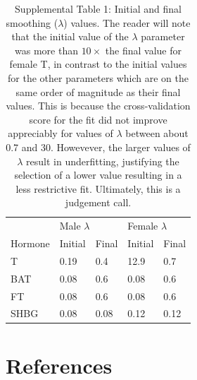 \documentclass[]{elsarticle} %
\begin{document}
\begin{table}[]
\caption*{Supplemental Table 1: Initial and final smoothing ($\lambda$) values. The reader will note that the initial value of the $\lambda$ parameter was more than $10\times$ the final value for female T, in contrast to the initial values for the other parameters which are on the same order of magnitude as their final values. This is because the cross-validation score for the fit did not improve appreciably for values of $\lambda$ between about 0.7 and 30.  Howevever, the larger values of $\lambda$ result in underfitting, justifying the selection of a lower value resulting in a less restrictive fit. Ultimately, this is a judgement call. }
\label{tab:my-table}
\begin{tabular}{l|llll}
                          & \multicolumn{2}{l}{Male $\lambda$} & \multicolumn{2}{l}{Female $\lambda$} \\ \cline{2-5} 
Hormone                   & Initial       & Final          & Initial        & Final            \\ \hline
T                         & 0.19           & 0.4            & 12.9          & 0.7              \\
BAT                       & 0.08           & 0.6            & 0.08          & 0.6              \\
FT                        & 0.08           & 0.6            & 0.08          & 0.6              \\
SHBG                      & 0.08           & 0.08           & 0.12          & 0.12       
\end{tabular}
\end{table}

\hypertarget{references}{%
\section*{References}\label{references}}
\end{document}
